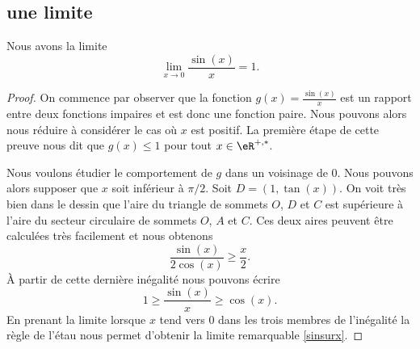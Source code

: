 \subsection{une limite}

\begin{proposition}
    Nous avons la limite
    \begin{equation}\label{sinsurx}
      \lim_{x\to 0} \frac{\sin(x)}{x} = 1.
    \end{equation}
\end{proposition}

\begin{proof}
    On commence par observer que la fonction $g(x)=\frac{\sin(x)}{x}$ est un rapport entre deux fonctions impaires et est donc une fonction paire. Nous pouvons alors nous réduire à considérer le cas où $x$ est positif. La première étape de cette preuve nous dit que $g(x)\leq 1$ pour tout $x\in\eR^{+,*}$. 

    Nous voulons étudier le comportement de $g$ dans un voisinage de $0$. Nous pouvons alors supposer que $x$ soit inférieur à $\pi/2$. Soit $D = (1, \tan (x))$. On voit très bien dans le dessin que l'aire du triangle de sommets $O$, $D$ et $C$ est supérieure à l'aire du secteur circulaire de sommets $O$, $A$ et $C$. Ces deux aires peuvent \^etre calculées très facilement et nous obtenons
    \begin{equation*}
      \frac{\sin(x)}{2\cos(x)} \geq \frac{x}{2}.
    \end{equation*}
    À partir de cette dernière inégalité nous pouvons écrire 
    \begin{equation*}
      1\geq \frac{\sin(x)}{x}\geq \cos(x).
    \end{equation*}
    En prenant la limite lorsque $x$ tend vers $0$ dans les trois membres de l'inégalité la règle de l'étau nous permet d'obtenir la limite remarquable  \eqref{sinsurx}. 
\end{proof}



